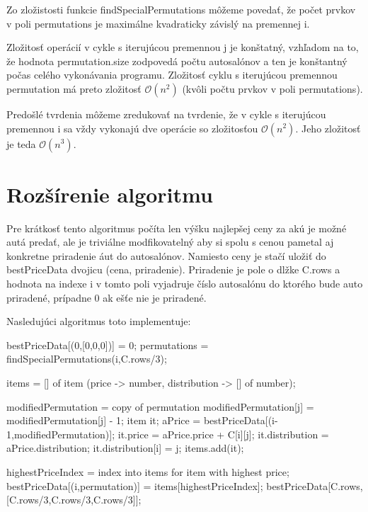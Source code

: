 \documentclass[paper=a4, fontsize=11pt]{scrartcl} %
\numberwithin{equation}{section} %
\numberwithin{figure}{section} %
\numberwithin{table}{section} %
\begin{document}
Zo zložistosti funkcie findSpecialPermutations môžeme povedať, že počet prvkov v poli permutations je maximálne kvadraticky závislý na premennej i.

Zložitosť operácií v cykle s iterujúcou premennou j je konštatný, vzhľadom na to, že hodnota permutation.size zodpovedá počtu autosalónov a ten je konštantný počas celého vykonávania programu.
Zložitosť cyklu s iterujúcou premennou permutation má preto zložitosť $\mathcal{O}(n^2)$ (kvôli počtu prvkov v poli permutations).

Predošlé tvrdenia môžeme zredukovať na tvrdenie, že v cykle s iterujúcou premennou i sa vždy vykonajú dve operácie so zložitosťou $\mathcal{O}(n^2)$.
Jeho zložitosť je teda $\mathcal{O}(n^3)$.


\section*{Rozšírenie algoritmu}

Pre krátkosť tento algoritmus počíta len výšku najlepšej ceny za akú je možné autá predať, ale je triviálne modfikovatelný aby si spolu s cenou pametal aj konkretne priradenie áut do autosalónov.
Namiesto ceny je stačí uložiť do bestPriceData dvojicu (cena, priradenie). Priradenie je pole o dlžke C.rows a hodnota na indexe i v tomto poli vyjadruje číslo autosalónu do ktorého bude auto priradené, prípadne 0 ak ešťe nie je priradené.

Nasledujúci algoritmus toto implementuje: \ \\




\begin{algorithmic}[1]
    bestPriceData[(0,[0,0,0])] = 0;
        \State permutations = findSpecialPermutations(i,C.rows/3);
				
            \State items = [] of item (price -> number, distribution -> [] of number); 
            
                \State modifiedPermutation = copy of permutation
		    \State modifiedPermutation[j] = modifiedPermutation[j] - 1;
		    \State	item it;
		    \State aPrice = bestPriceData[(i-1,modifiedPermutation)];
		    \State it.price = aPrice.price + C[i][j];
		    \State it.distribution = aPrice.distribution;
		    \State it.distribution[i] = j;
                    \State items.add(it);
                 \EndIf
            \EndFor			
		
            \State highestPriceIndex = index into items for item with highest price;
            \State bestPriceData[(i,permutation)] = items[highestPriceIndex];		
        \EndFor
    \EndFor
     \State \Return bestPriceData[C.rows,[C.rows/3,C.rows/3,C.rows/3]];
\EndFunction
\end{algorithmic}
\end{document}
